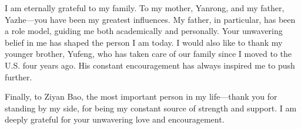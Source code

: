 I am eternally grateful to my family. To my mother, Yanrong, and my father, Yazhe—you have been my greatest influences. My father, in particular, has been a role model, guiding me both academically and personally. Your unwavering belief in me has shaped the person I am today. I would also like to thank my younger brother, Yufeng, who has taken care of our family since I moved to the U.S. four years ago. His constant encouragement has always inspired me to push further.

Finally, to Ziyan Bao, the most important person in my life—thank you for standing by my side, for being my constant source of strength and support. I am deeply grateful for your unwavering love and encouragement.


